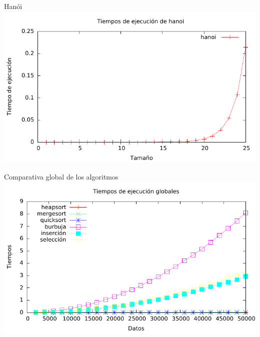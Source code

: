 \documentclass[10pt,compress,usetitleprogressbar,mathserif]{beamer}
\begin{document}
\begin{frame}{Hanói}
		\includegraphics[width = \textwidth ]{hanoi_g}
\end{frame}

\begin{frame}{Comparativa global de los algoritmos}
		\includegraphics[width = \textwidth ]{comparativa_global}
\end{frame}
\end{document}
